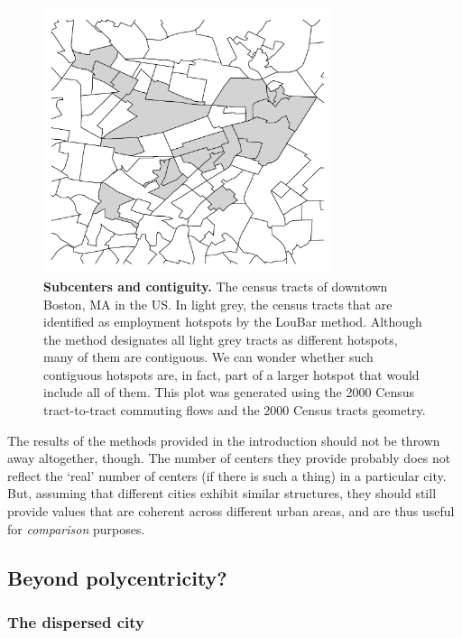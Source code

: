 \begin{figure}[!h]
    \centering
    \includegraphics[width=0.75\textwidth]{gfx/chapter-monocentric/hotspots_boston.pdf}
    \caption{{\bf Subcenters and contiguity.} The census tracts of downtown Boston, MA in the US. In light grey,
    the census tracts that are identified as employment hotspots by the LouBar
method. Although the method designates all light grey tracts as different hotspots,
many of them are contiguous. We can wonder whether such contiguous
hotspots are, in fact, part of a larger hotspot that would include all of them.
This plot was generated using the 2000 Census tract-to-tract
commuting flows and the 2000 Census tracts geometry.\label{fig:hotspots_boston}}
\end{figure}


The results of the methods provided in the introduction should not be thrown
away altogether, though. The number of centers they provide probably does not
reflect the `real' number of centers (if there is such a thing) in a particular
city. But, assuming that different cities exhibit similar structures, they
should still provide values that are coherent across different urban areas, and
are thus useful for \emph{comparison} purposes.\\


\subsection{Beyond polycentricity?}
\label{sec:beyond_polycentricity}


\subsubsection{The dispersed city}
\label{sub:the_dispersed_city}

